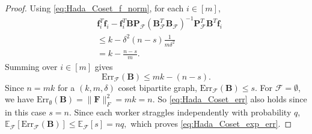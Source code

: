 \documentclass[journal,draftcls,onecolumn]{IEEEtran}
\theoremstyle{mystyle}
\newtheorem{lemma}{Lemma}
\newcommand{\bfF}{\mathbf{F}}
\newcommand{\bfA}{\mathbf{A}}
\newcommand{\bfB}{\mathbf{B}}
\newcommand{\bfP}{\mathbf{P}}
\newcommand{\cF}{\mathcal{F}}
\begin{document}
\begin{proof}
Using \eqref{eq:Hada_Coset_f_norm}, for each $i\in[m]$,
\begin{align*}
&\mathbf{f}_i^T\mathbf{f}_i
-\mathbf{f}_i^T\bfB\bfP_{\cF}
(\bfB_{\cF}^T\bfB_{\cF})^{-1}
\bfP_{\cF}^T\bfB^T\mathbf{f}_i\\
&\leq
k-\delta^2(n-s)\frac{1}{m\delta^2}\\
&=
k-\frac{n-s}{m}.
\end{align*}
Summing over $i\in[m]$ gives
\[
\text{Err}_{\cF}(\bfB)
\leq
mk-(n-s).
\]
Since $n=mk$ for a $(k,m,\delta)$ coset bipartite graph,
$
\text{Err}_{\cF}(\bfB)\leq s.
$ For $\cF=\emptyset$, we have
$\text{Err}_{\emptyset}(\bfB)=\|\bfF\|_F^2=mk=n$. So \eqref{eq:Hada_Coset_err} also holds since in this case $s=n$. Since each worker straggles independently with probability $q$, 
$
\mathbb{E}_{\cF}\left[\text{Err}_{\cF}(\bfB)\right]
\leq
\mathbb{E}_{\cF}[s]
=
nq,
$ which proves \eqref{eq:Hada_Coset_exp_err}.
\end{proof}




\end{document}
